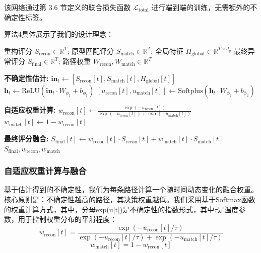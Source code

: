 \documentclass{setp-new}
\begin{document}
该网络通过第 3.6 节定义的联合损失函数 $\mathcal{L}_{\text{total}}$ 进行端到端的训练，无需额外的不确定性标签。

算法4具体展示了我们的设计理念：
\begin{algorithm}[H]
\caption{不确定性感知自适应融合模块}
\label{alg:uncertainty_fusion}
\begin{algorithmic}[1]
\Require 重构评分 $S_{\text{recon}} \in \mathbb{R}^{T}$; 原型匹配评分 $S_{\text{match}} \in \mathbb{R}^{T}$; 全局特征 $H_{\text{global}} \in \mathbb{R}^{T \times d_g}$
\Ensure 最终异常评分 $S_{\text{final}} \in \mathbb{R}^{T}$; 路径权重 $W_{\text{recon}}, W_{\text{match}} \in \mathbb{R}^{T}$

    \State \textbf{不确定性估计:}
    \State $\mathbf{in}_t \gets [S_{\text{recon}}[t], S_{\text{match}}[t], H_{\text{global}}[t]]$ 
    \State $\mathbf{h}_t \gets \text{ReLU}(\mathbf{in}_t \cdot W_{\phi_1} + b_{\phi_1})$ 
    \State $[u_{\text{recon}}[t], u_{\text{match}}[t]] \gets \text{Softplus}(\mathbf{h}_t \cdot W_{\phi_2} + b_{\phi_2})$ 

    \State \textbf{自适应权重计算:}
    \State $w_{\text{recon}}[t] \gets \frac{\exp(-u_{\text{recon}}[t])}{\exp(-u_{\text{recon}}[t]) + \exp(-u_{\text{match}}[t])}$ 
    \State $w_{\text{match}}[t] \gets 1 - w_{\text{recon}}[t]$ 

    \State \textbf{最终评分融合:}
    \State $S_{\text{final}}[t] \gets w_{\text{recon}}[t] \cdot S_{\text{recon}}[t] + w_{\text{match}}[t] \cdot S_{\text{match}}[t]$ 
\EndFor
\State \Return $S_{\text{final}}, w_{\text{recon}}, w_{\text{match}}$
\end{algorithmic}
\end{algorithm}

\subsubsection{自适应权重计算与融合}
基于估计得到的不确定性，我们为每条路径计算一个随时间动态变化的融合权重。核心原则是：不确定性越高的路径，其决策权重越低。我们采用基于Softmax函数的权重计算方式，其中，分母exp(u[t])是不确定性的指数形式，其中$\tau$是温度参数，用于控制权重分布的平滑程度：
\begin{equation}
w_{\text{recon}}[t] = \frac{\exp(-u_{\text{recon}}[t]/\tau)}{\exp(-u_{\text{recon}}[t]/\tau) + \exp(-u_{\text{match}}[t]/\tau)}
\tag{19}
\end{equation}
\begin{equation}
w_{\text{match}}[t] = 1 - w_{\text{recon}}[t]\tag{20}
\end{equation}
\end{document}
